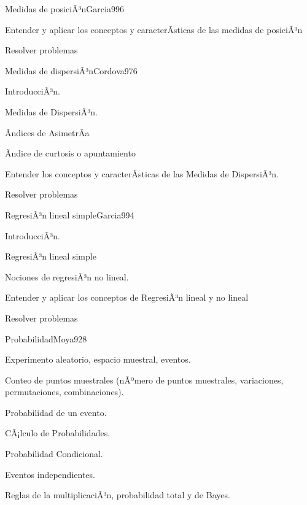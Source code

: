 \begin{syllabus}
\begin{unit}{Medidas de posiciÃ³n}{Garcia99}{6}
   \begin{unitgoals}
         \item  Entender y aplicar los conceptos y caracterÃ­sticas de las medidas de posiciÃ³n
         \item  Resolver problemas
   \end{unitgoals}
\end{unit}

\begin{unit}{Medidas de dispersiÃ³n}{Cordova97}{6}
   \begin{topics}
         \item  IntroducciÃ³n.
	 \item  Medidas de DispersiÃ³n.
         \item  Ãndices de AsimetrÃ­a
	 \item  Ãndice de curtosis o apuntamiento
   \end{topics}

   \begin{unitgoals}
         \item  Entender los conceptos y caracterÃ­sticas de las Medidas de DispersiÃ³n.
         \item  Resolver problemas
   \end{unitgoals}
\end{unit}

\begin{unit}{RegresiÃ³n lineal simple}{Garcia99}{4}
   \begin{topics}
         \item  IntroducciÃ³n.
	 \item  RegresiÃ³n lineal simple
         \item  Nociones de regresiÃ³n no lineal.
   \end{topics}

   \begin{unitgoals}
         \item  Entender y aplicar los conceptos de RegresiÃ³n lineal y no lineal
         \item  Resolver problemas
   \end{unitgoals}
\end{unit}

\begin{unit}{Probabilidad}{Moya92}{8}
   \begin{topics}
         \item  Experimento aleatorio, espacio muestral, eventos.
	 \item  Conteo de puntos muestrales (nÃºmero de puntos muestrales, variaciones, permutaciones, combinaciones).
         \item  Probabilidad de un evento.
	 \item  CÃ¡lculo de Probabilidades.
	\item Probabilidad Condicional.
	\item Eventos independientes.
	\item Reglas de la multiplicaciÃ³n, probabilidad total y de Bayes.
   \end{topics}


\end{unit}
\end{syllabus}
